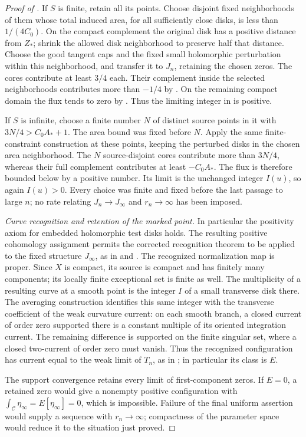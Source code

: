 \begin{proof}[Proof of ]
If \(S\) is finite, retain all its points.  Choose disjoint
fixed neighborhoods of them whose total induced area, for all
sufficiently close disks, is less than \(1/(4C_0)\).  On the
compact complement the original disk has a positive distance from
\(Z_*\); shrink the allowed disk neighborhood to preserve half
that distance.  Choose the good tangent caps and the fixed small
holomorphic perturbation within this neighborhood, and transfer it
to \(J_n\), retaining the chosen zeros.  The cores contribute
at least \(3/4\) each.  Their complement inside the selected
neighborhoods contributes more than \(-1/4\) by
.  On the remaining compact
domain the flux tends to zero by
.  Thus the limiting integer
in  is positive.

If \(S\) is infinite, choose a finite number \(N\) of distinct
source points in it with
\(3N/4>C_0A_*+1\).  The area bound was fixed before \(N\).
Apply the same finite-constraint construction at these points,
keeping the perturbed disks in the chosen area neighborhood.
The \(N\) source-disjoint cores contribute more than \(3N/4\),
whereas their full complement contributes at least \(-C_0A_*\).
The flux is therefore bounded below by a positive number.  Its
limit is the unchanged integer \(I(u)\), so again \(I(u)>0\).
Every choice was finite and fixed before the last passage to large
\(n\); no rate relating \(J_n\to J_\infty\) and
\(r_n\to\infty\) has been imposed.

\smallskip
\noindent\emph{Curve recognition and retention of the marked point.}
In particular the positivity axiom for embedded holomorphic test
disks holds.  The resulting positive cohomology assignment permits
the corrected recognition theorem to be applied to the fixed
structure \(J_\infty\), as in
\cite[Lemmas~7.2--7.3 and Proposition~7.1]{Taubes1999}
and \cite{Taubes2000}.
The recognized normalization map is proper.  Since \(X\) is
compact, its source is compact and has finitely many components;
its locally finite exceptional set is finite as well.
The multiplicity of a resulting curve at a smooth point is the
integer \(I\) of a small transverse disk there.  The averaging
construction identifies this same integer with the transverse
coefficient of the weak curvature current: on each smooth branch,
a closed current of order zero supported there is a constant
multiple of its oriented integration current.  The remaining
difference is supported on the finite singular set, where a
closed two-current of order zero must vanish.  Thus the recognized
configuration has current equal to the weak limit of \(T_n\),
as in \cite[Proposition~7.1 and Equation~(7.12) in the proof of
Lemma~7.4]{Taubes1999}; in particular its class is
\(E\).

The support convergence retains every limit of first-component
zeros.  If \(E=0\), a retained zero would give a nonempty positive
configuration with
\(\int_{\mathcal C}\eta_\infty=E[\eta_\infty]=0\), which
is impossible.  Failure of the final uniform assertion would supply
a sequence with \(r_n\to\infty\); compactness of the parameter
space would reduce it to the situation just proved.
\end{proof}
